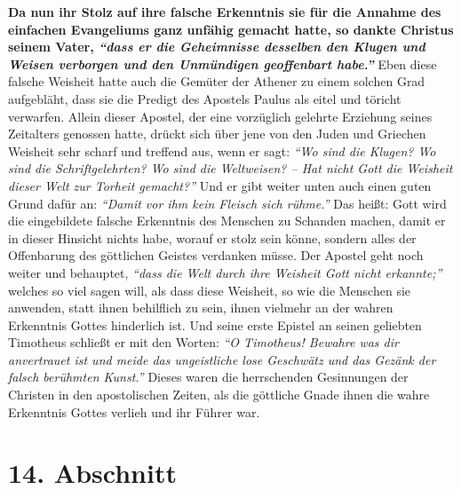 \label{ref:07_13_gelehrte}
\textbf{Da nun ihr Stolz auf ihre falsche Erkenntnis
sie für die Annahme des einfachen
Evangeliums ganz unfähig gemacht hatte, so dankte Christus seinem Vater,
\textit{"`dass er die Geheimnisse desselben den Klugen und Weisen verborgen und
den Unmündigen geoffenbart habe."'}}
Eben diese falsche Weisheit hatte
auch die Gemüter der
Athener zu einem solchen Grad
aufgebläht, dass sie
die Predigt des Apostels Paulus als eitel und töricht
verwarfen. Allein dieser
Apostel, der eine vorzüglich gelehrte Erziehung seines Zeitalters genossen
hatte, drückt sich über jene von den Juden und
Griechen
Weisheit sehr scharf und treffend aus, wenn er sagt:
\textit{"`Wo sind die Klugen? Wo
sind die Schriftgelehrten? Wo sind die Weltweisen? -- Hat nicht Gott die
Weisheit dieser Welt zur Torheit gemacht?"'}
Und er
gibt weiter unten auch einen guten Grund dafür an:
\textit{"`Damit vor ihm kein Fleisch sich rühme."'}
Das heißt: Gott wird die eingebildete
falsche Erkenntnis des Menschen zu Schanden machen, damit er in dieser Hinsicht
nichts habe, worauf er stolz sein könne, sondern alles der
Offenbarung des
göttlichen Geistes verdanken müsse. Der Apostel geht noch weiter und behauptet,
\textit{"`dass die Welt durch ihre Weisheit Gott nicht erkannte;"'}
welches so viel sagen
will, als dass diese Weisheit, so wie die Menschen sie anwenden, statt ihnen
behilflich zu sein, ihnen vielmehr an der wahren Erkenntnis Gottes hinderlich
ist. Und seine erste Epistel an seinen geliebten Timotheus schließt er mit den
Worten:
\textit{"`O Timotheus! Bewahre was dir anvertrauet ist und meide das
ungeistliche lose Geschwätz und das Gezänk der falsch berühmten
Kunst."'}
Dieses waren die herrschenden Gesinnungen der
Christen in den apostolischen Zeiten, als die göttliche Gnade ihnen die wahre
Erkenntnis Gottes verlieh und ihr Führer war.

\section{14. Abschnitt} \label{kap7_ab14}

